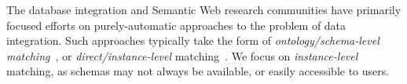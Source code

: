 \documentclass{sigchi}
\begin{document}
The database integration and Semantic Web \cite{Shadbolt:2006:SWR:1155313.1155373} research communities have primarily focused efforts on purely-automatic approaches to the problem of data integration.  Such approaches typically take the form of \emph{ontology/schema-level matching}~\cite{euzenat2004api,doan2003learning}, or \emph{direct/instance-level} matching~\cite{suchanek2011paris,castano2006matching}.  We focus on \emph{instance-level} matching, as schemas may not always be available, or easily accessible to users.



\end{document}
